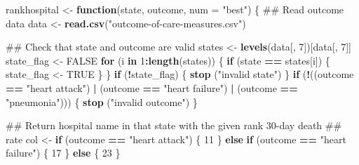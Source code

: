 \documentclass[]{article}
\newenvironment{Shaded}{\begin{snugshade}}{\end{snugshade}}
\newcommand{\KeywordTok}[1]{\textcolor[rgb]{0.13,0.29,0.53}{\textbf{#1}}}
\newcommand{\DataTypeTok}[1]{\textcolor[rgb]{0.13,0.29,0.53}{#1}}
\newcommand{\DecValTok}[1]{\textcolor[rgb]{0.00,0.00,0.81}{#1}}
\newcommand{\StringTok}[1]{\textcolor[rgb]{0.31,0.60,0.02}{#1}}
\newcommand{\OtherTok}[1]{\textcolor[rgb]{0.56,0.35,0.01}{#1}}
\newcommand{\ControlFlowTok}[1]{\textcolor[rgb]{0.13,0.29,0.53}{\textbf{#1}}}
\newcommand{\OperatorTok}[1]{\textcolor[rgb]{0.81,0.36,0.00}{\textbf{#1}}}
\newcommand{\NormalTok}[1]{#1}
\begin{document}
\begin{Shaded}
\begin{Highlighting}[]
\NormalTok{rankhospital <-}\StringTok{ }\ControlFlowTok{function}\NormalTok{(state, outcome, }\DataTypeTok{num =} \StringTok{"best"}\NormalTok{) \{}
\NormalTok{        ## Read outcome data}
\NormalTok{        data <-}\StringTok{ }\KeywordTok{read.csv}\NormalTok{(}\StringTok{"outcome-of-care-measures.csv"}\NormalTok{)}

\NormalTok{        ## Check that state and outcome are valid}
\NormalTok{        states <-}\StringTok{ }\KeywordTok{levels}\NormalTok{(data[, }\DecValTok{7}\NormalTok{])[data[, }\DecValTok{7}\NormalTok{]]}
\NormalTok{        state_flag <-}\StringTok{ }\OtherTok{FALSE}
        \ControlFlowTok{for}\NormalTok{ (i }\ControlFlowTok{in} \DecValTok{1}\OperatorTok{:}\KeywordTok{length}\NormalTok{(states)) \{}
                \ControlFlowTok{if}\NormalTok{ (state }\OperatorTok{==}\StringTok{ }\NormalTok{states[i]) \{}
\NormalTok{                        state_flag <-}\StringTok{ }\OtherTok{TRUE}
\NormalTok{                \}}
\NormalTok{        \}}
        \ControlFlowTok{if}\NormalTok{ (}\OperatorTok{!}\NormalTok{state_flag) \{}
                \KeywordTok{stop}\NormalTok{ (}\StringTok{"invalid state"}\NormalTok{)}
\NormalTok{        \} }
        \ControlFlowTok{if}\NormalTok{ (}\OperatorTok{!}\NormalTok{((outcome }\OperatorTok{==}\StringTok{ "heart attack"}\NormalTok{) }\OperatorTok{|}\StringTok{ }\NormalTok{(outcome }\OperatorTok{==}\StringTok{ "heart failure"}\NormalTok{)}
              \OperatorTok{|}\StringTok{ }\NormalTok{(outcome }\OperatorTok{==}\StringTok{ "pneumonia"}\NormalTok{))) \{}
                \KeywordTok{stop}\NormalTok{ (}\StringTok{"invalid outcome"}\NormalTok{)}
\NormalTok{        \}}

\NormalTok{        ## Return hospital name in that state with the given rank 30-day death }
\NormalTok{        ## rate}
\NormalTok{        col <-}\StringTok{ }\ControlFlowTok{if}\NormalTok{ (outcome }\OperatorTok{==}\StringTok{ "heart attack"}\NormalTok{) \{}
                \DecValTok{11}
\NormalTok{        \} }\ControlFlowTok{else} \ControlFlowTok{if}\NormalTok{ (outcome }\OperatorTok{==}\StringTok{ "heart failure"}\NormalTok{) \{}
                \DecValTok{17}
\NormalTok{        \} }\ControlFlowTok{else}\NormalTok{ \{}
                \DecValTok{23}
\NormalTok{        \}}
        

\end{Highlighting}
\end{Shaded}
\end{document}
